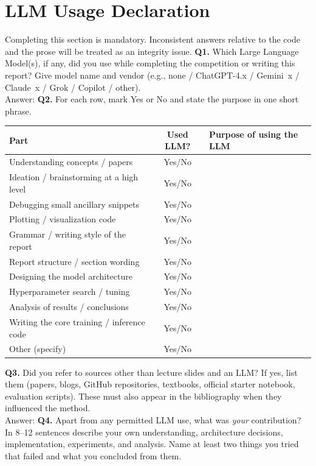 \documentclass[11pt, oneside]{article}
\begin{document}
\section*{LLM Usage Declaration}
Completing this section is mandatory. Inconsistent answers relative to the code and the prose will be treated as an integrity issue.
\medskip
\noindent
\textbf{Q1.} Which Large Language Model(s), if any, did you use while completing the competition or writing this report? Give model name and vendor (e.g., none / ChatGPT-4.x / Gemini~x / Claude~x / Grok / Copilot / other). \\[0.6em]
Answer: \underline{\hspace{0.88\textwidth}}
\medskip
\noindent
\textbf{Q2.} For each row, mark Yes or No and state the purpose in one short phrase. 
\begin{table}[H]
\centering
\begin{tabular}{>{\raggedright\arraybackslash}p{4.6cm}|c|>{\raggedright\arraybackslash}p{7.2cm}}
\toprule
Part & Used LLM? & Purpose of using the LLM \\
\midrule
Understanding concepts / papers & Yes/No &  \\
Ideation / brainstorming at a high level & Yes/No &  \\
Debugging small ancillary snippets & Yes/No &  \\
Plotting / visualization code & Yes/No &  \\
Grammar / writing style of the report & Yes/No &  \\
Report structure / section wording & Yes/No &  \\
Designing the model architecture & Yes/No & \\
Hyperparameter search / tuning & Yes/No &  \\
Analysis of results / conclusions & Yes/No & \\
Writing the core training / inference code & Yes/No &  \\
Other (specify) & Yes/No &  \\
\bottomrule
\end{tabular}
\end{table}
\medskip
\noindent
\textbf{Q3.} Did you refer to sources other than lecture slides and an LLM?
If yes, list them (papers, blogs, GitHub repositories, textbooks, official starter notebook, evaluation scripts). These must also appear in the bibliography when they influenced the method. \\[0.4em]
Answer:
\medskip
\noindent
\textbf{Q4.} Apart from any permitted LLM use, what was \emph{your} contribution? In 8--12 sentences describe your own understanding, architecture decisions, implementation, experiments, and analysis. Name at least two things you tried that failed and what you concluded from them.
\medskip
\noindent
\vspace{1.4cm}


\end{document}
